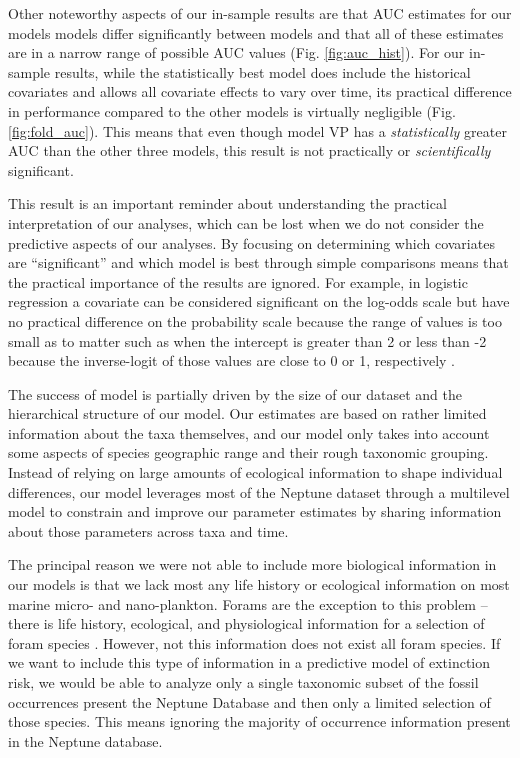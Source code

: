 \documentclass[12pt,letterpaper]{article}
\begin{document}
Other noteworthy aspects of our in-sample results are that AUC estimates for our models models differ significantly between models and that all of these estimates are in a narrow range of possible AUC values (Fig. \ref{fig:auc_hist}). For our in-sample results, while the statistically best model does include the historical covariates and allows all covariate effects to vary over time, its practical difference in performance compared to the other models is virtually negligible (Fig. \ref{fig:fold_auc}). This means that even though model VP has a \textit{statistically} greater AUC than the other three models, this result is not practically or \textit{scientifically} significant. 

This result is an important reminder about understanding the practical interpretation of our analyses, which can be lost when we do not consider the predictive aspects of our analyses. By focusing on determining which covariates are ``significant'' and which model is best through simple comparisons means that the practical importance of the results are ignored. For example, in logistic regression a covariate can be considered significant on the log-odds scale but have no practical difference on the probability scale because the range of values is too small as to matter such as when the intercept is greater than 2 or less than -2 because the inverse-logit of those values are close to 0 or 1, respectively \citep{ARM}.

The success of model is partially driven by the size of our dataset and the hierarchical structure of our model. Our estimates are based on rather limited information about the taxa themselves, and our model only takes into account some aspects of species geographic range and their rough taxonomic grouping. Instead of relying on large amounts of ecological information to shape individual differences, our model leverages most of the Neptune dataset through a multilevel model to constrain and improve our parameter estimates by sharing information about those parameters across taxa and time.

The principal reason we were not able to include more biological information in our models is that we lack most any life history or ecological information on most marine micro- and nano-plankton. Forams are the exception to this problem -- there is life history, ecological, and physiological information for a selection of foram species \citep{Ezard2011}. However, not this information does not exist all foram species. If we want to include this type of information in a predictive model of extinction risk, we would be able to analyze only a single taxonomic subset of the fossil occurrences present the Neptune Database and then only a limited selection of those species. This means ignoring the majority of occurrence information present in the Neptune database.
\end{document}
